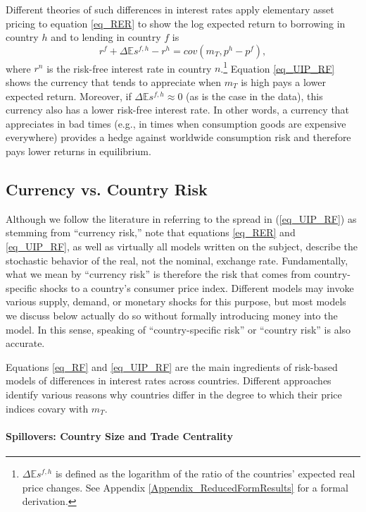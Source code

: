 \documentclass{ar-1col}
\begin{document}
Different theories of such differences in interest rates apply elementary asset pricing to equation \ref{eq_RER} to show the log expected return to borrowing in country $h$ and to lending in country $f$ is
\begin{equation}
  r^{f} + \Delta \mathbb{E} s^{f,h} - r^{h} 
  = cov \left( m_{T}, p^{h}-p^{f}\right),
  \label{eq_UIP_RF}
\end{equation}%
where $r^{n}$ is the risk-free interest rate in country $n$.\footnote{$\Delta \mathbb{E} s^{f,h}$ is defined as the logarithm of the ratio of the countries' expected real price changes. See Appendix \ref{Appendix_ReducedFormResults} for a formal derivation.} Equation \ref{eq_UIP_RF} shows the currency that tends to appreciate when $m_T$ is high pays a lower expected return. Moreover, if $\Delta \mathbb{E} s^{f,h}\approx0$ (as is the case in the data), this currency also has a lower risk-free interest rate. In other words, a currency that appreciates in bad times (e.g., in times when consumption goods are expensive everywhere) provides a hedge against worldwide consumption risk and therefore pays lower returns in equilibrium.

\begin{textbox}[]
\section{Currency vs. Country Risk}
Although we follow the literature in referring to the spread in (\ref{eq_UIP_RF}) as stemming from ``currency risk,'' note that equations \ref{eq_RER} and \ref{eq_UIP_RF}, as well as virtually all models written on the subject, describe the stochastic behavior of the real, not the nominal, exchange rate. Fundamentally, what we mean by ``currency risk'' is therefore the risk that comes from country-specific shocks to a country's consumer price index. Different models may invoke various supply, demand, or monetary shocks for this purpose, but most models we discuss below actually do so without formally introducing money into the model. In this sense, speaking of ``country-specific risk'' or ``country risk'' is also accurate. 
\end{textbox}

Equations \ref{eq_RF} and \ref{eq_UIP_RF} are the main ingredients of risk-based models of differences in interest rates across countries. Different approaches identify various reasons why countries differ in the degree to which their price indices covary with $m_T$.

\paragraph*{Spillovers: Country Size and Trade Centrality}
\end{document}
